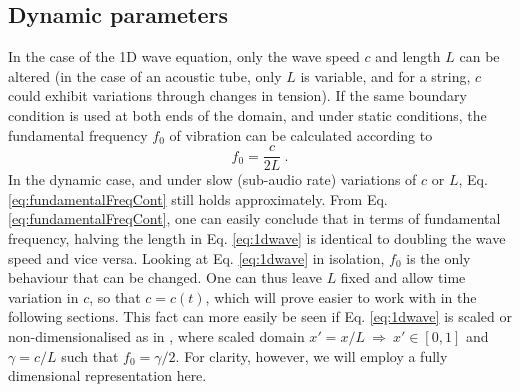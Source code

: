 \subsection{Dynamic parameters}\label{sec:dynamicParamsCont}
In the case of the 1D wave equation, only the wave speed $c$ and length $L$ can be altered (in the case of an acoustic tube, only $L$ is variable, and for a string, $c$ could exhibit variations through changes in tension). If the same boundary condition is used at both ends of the domain, and under static conditions, the fundamental frequency $f_0$ of vibration can be calculated according to
\begin{equation}\label{eq:fundamentalFreqCont}
    f_0 = \frac{c}{2L}\ .
\end{equation}
In the dynamic case, and under slow (sub-audio rate) variations of $c$ or $L$, Eq. \eqref{eq:fundamentalFreqCont} still holds approximately.
%
From Eq. \eqref{eq:fundamentalFreqCont}, one can easily conclude that in terms of fundamental frequency, halving the length in Eq. \eqref{eq:1dwave} is identical to doubling the wave speed and vice versa. Looking at Eq. \eqref{eq:1dwave} in isolation, $f_0$ is the only behaviour that can be changed. One can thus leave $L$ fixed %
and allow time variation in $c$, so that $c = c(t)$, which will prove easier to work with in the following sections. This fact can more easily be seen if Eq. \eqref{eq:1dwave} is scaled or non-dimensionalised as in \cite{bilbao2009}, where scaled domain  $x' = x/L\  \Rightarrow \ x'\in[0, 1]$ and $\gamma = c/L$ such that $f_0 = \gamma / 2$. For clarity, however, we will employ a fully dimensional representation here.
